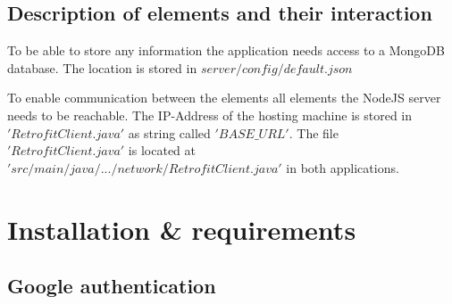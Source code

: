 \documentclass[article,colorback,accentcolor=tud4c, 11pt]{tudreport}
\begin{document}
	
\subsection{Description of elements and their interaction}

To be able to store any information the application needs access to a MongoDB database. The location is stored in $server/config/default.json$

To enable communication between the elements all elements the NodeJS server needs to be reachable. The IP-Address of the hosting machine is stored in $'RetrofitClient.java'$ as string called $'BASE\_URL'$. The file $'RetrofitClient.java'$ is located at $'src/main/java/.../network/RetrofitClient.java'$ in both applications.

\section{Installation \& requirements}		
	
\subsection{Google authentication}
\end{document}
